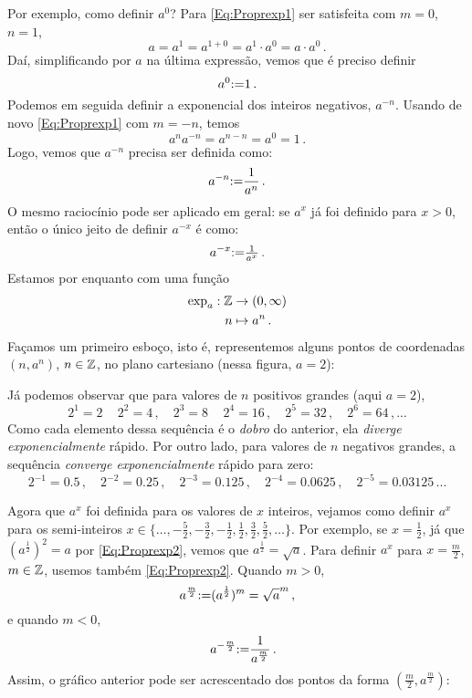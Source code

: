 Por exemplo, como definir $a^0$? Para \eqref{Eq:Proprexp1} ser satisfeita com
$m=0$, $n=1$,
$$a=a^1=a^{1+0}=a^1\cdot a^0=a\cdot a^0\,.$$
Daí, simplificando por $a$ na última expressão, 
vemos que é preciso definir $$a^0{:=} 1\,.$$ 
Podemos em seguida definir a exponencial dos inteiros {negativos}, $a^{-n}$.
Usando de novo \eqref{Eq:Proprexp1} com $m=-n$, temos
$$a^{n}a^{-n}=a^{n-n}=a^0=1\,.$$
Logo, vemos que $a^{-n}$ precisa ser definida como:
$$
a^{-n}{:=} \frac{1}{a^n}\,.
$$
O mesmo raciocínio pode ser aplicado em geral: se $a^x$ já foi definido para
$x>0$, então o único jeito de definir $a^{-x}$ é como: 
$$a^{-x}{:=} \tfrac{1}{a^x}\,.$$ 
Estamos por enquanto com uma função 
\begin{align*}
 \exp_a:\mathbb{Z}&\to (0,\infty)\\
n&\mapsto a^n\,.
\end{align*}
Façamos um primeiro esboço, isto é,
representemos alguns pontos de coordenadas $(n,a^n)$, $n\in \mathbb{Z}$, no plano
cartesiano
(nessa figura, $a=2$):
\begin{center}
\begin{bmlimage}\end{bmlimage}
\end{center}
Já podemos observar que para valores de $n$ positivos grandes (aqui $a=2$), 
$$2^1=2\,\quad 2^2=4\,,\quad 2^3=8\,\quad 2^4=16\,,\quad 2^5=32\,,\quad
2^6=64\,,...$$
Como cada elemento dessa sequência é o \emph{dobro} do anterior, ela
\emph{diverge exponencialmente} rápido.
Por outro lado, para valores de $n$ negativos grandes, a sequência
\emph{converge exponencialmente} rápido para zero: 
$$
2^{-1}=0.5\,,\quad 2^{-2}=0.25\,,\quad 2^{-3}=0.125\,,\quad
2^{-4}=0.0625\,,\quad 2^{-5}=0.03125\,...
$$

Agora que $a^x$ foi definida para os valores de $x$ inteiros, vejamos como 
definir $a^x$ para os semi-inteiros
$x\in\{\dots,-\frac52,-\frac32,-\frac12, \frac12, \frac32,\frac52,\dots\}$.
Por exemplo, se $x=\tfrac{1}{2}$, já que $(a^{\frac12})^2=a$ por
\eqref{Eq:Proprexp2}, vemos que
$a^{\frac12}=\sqrt{a}$. Para definir $a^x$ para $x=\frac{m}{2}$, $m\in\mathbb{Z}$,
usemos também \eqref{Eq:Proprexp2}. Quando $m>0$,
$$
a^{\frac{m}{2}}{:=} (a^{\frac{1}{2}})^m=\sqrt{a}^m\,,$$
e quando $m<0$,
$$\quad a^{-\frac{m}{2}}{:=} \frac{1}{a^{\frac{m}{2}}}\,.
$$
Assim, o gráfico anterior pode ser acrescentado dos pontos da forma
$(\tfrac{m}{2},a^{\frac{m}{2}})$:

